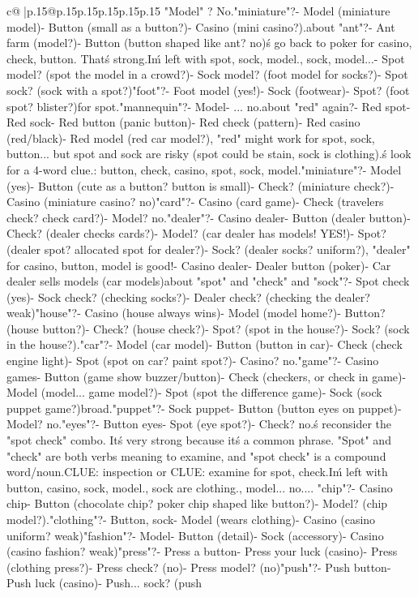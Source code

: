 \documentclass{article}
\begin{document}
{\begin{supertabular}{c@{$\;$}|p{.15\linewidth}@{}p{.15\linewidth}p{.15\linewidth}p{.15\linewidth}p{.15\linewidth}p{.15\linewidth}}
{{{"Model" ? No.\n\n"miniature"?\n- Model (miniature model)\n- Button (small as a button?)\n- Casino (mini casino?)\nWeak.\n\nWhat about "ant"?\n- Ant farm (model?)\n- Button (button shaped like ant? no)\n\nLet\'s go back to poker for casino, check, button. That\'s strong.\n\nThen I\'m left with spot, sock, model.\n\nSpot, sock, model...\n- Spot model? (spot the model in a crowd?)\n- Sock model? (foot model for socks?)\n- Spot sock? (sock with a spot?)\n\n"foot"?\n- Foot model (yes!)\n- Sock (footwear)\n- Spot? (foot spot? blister?)\nWeak for spot.\n\n"mannequin"?\n- Model\n- ... no.\n\nWhat about "red" again?\n- Red spot\n- Red sock\n- Red button (panic button)\n- Red check (pattern)\n- Red casino (red/black)\n- Red model (red car model?)\nActually, "red" might work for spot, sock, button... but spot and sock are risky (spot could be stain, sock is clothing).\n\nLet\'s look for a 4-word clue.\nWords: button, check, casino, spot, sock, model.\n\n"miniature"?\n- Model (yes)\n- Button (cute as a button? button is small)\n- Check? (miniature check?)\n- Casino (miniature casino? no)\n\n"card"?\n- Casino (card game)\n- Check (travelers check? check card?)\n- Model? no.\n\n"dealer"?\n- Casino dealer\n- Button (dealer button)\n- Check? (dealer checks cards?)\n- Model? (car dealer has models! YES!)\n- Spot? (dealer spot? allocated spot for dealer?)\n- Sock? (dealer socks? uniform?)\n\nWait, "dealer" for casino, button, model is good!\n- Casino dealer\n- Dealer button (poker)\n- Car dealer sells models (car models)\n\nWhat about "spot" and "check" and "sock"?\n- Spot check (yes)\n- Sock check? (checking socks?)\n- Dealer check? (checking the dealer? weak)\n\n"house"?\n- Casino (house always wins)\n- Model (model home?)\n- Button? (house button?)\n- Check? (house check?)\n- Spot? (spot in the house?)\n- Sock? (sock in the house?)\nWeak.\n\n"car"?\n- Model (car model)\n- Button (button in car)\n- Check (check engine light)\n- Spot (spot on car? paint spot?)\n- Casino? no.\n\n"game"?\n- Casino games\n- Button (game show buzzer/button)\n- Check (checkers, or check in game)\n- Model (model... game model?)\n- Spot (spot the difference game)\n- Sock (sock puppet game?)\nToo broad.\n\n"puppet"?\n- Sock puppet\n- Button (button eyes on puppet)\n- Model? no.\n\n"eyes"?\n- Button eyes\n- Spot (eye spot?)\n- Check? no.\n\nLet\'s reconsider the "spot check" combo. It\'s very strong because it\'s a common phrase. "Spot" and "check" are both verbs meaning to examine, and "spot check" is a compound word/noun.\n\nSo CLUE: inspection or CLUE: examine for spot, check.\n\nThen I\'m left with button, casino, sock, model.\n\nButton, sock are clothing.\nCasino, model... no.\n\nUnless... "chip"?\n- Casino chip\n- Button (chocolate chip? poker chip shaped like button?)\n- Model? (chip model?)\nWeak.\n\n"clothing"?\n- Button, sock\n- Model (wears clothing)\n- Casino (casino uniform? weak)\n\n"fashion"?\n- Model\n- Button (detail)\n- Sock (accessory)\n- Casino (casino fashion? weak)\n\n"press"?\n- Press a button\n- Press your luck (casino)\n- Press (clothing press?)\n- Press check? (no)\n- Press model? (no)\n\n"push"?\n- Push button\n- Push luck (casino)\n- Push... sock? (push }}}
\end{supertabular}}
\end{document}
